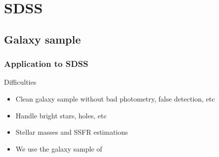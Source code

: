 \section{SDSS}
\subsection{Galaxy sample}
\begin{frame}
    \frametitle{Application to SDSS}
            \begin{minipage}[c][0.7\textheight][c]{\linewidth}
                \begin{block}{Difficulties}
                    \begin{itemize}
                        \item<1-> Clean galaxy sample without bad photometry,
                            false detection, etc
                        \item<2-> Handle bright stars, holes, etc
                        \item<3-> Stellar masses and SSFR estimations
                        \item<4-> We use the galaxy sample of \citet{Tempel+14}
                    \end{itemize}
                \end{block}
            \end{minipage}
\end{frame}

